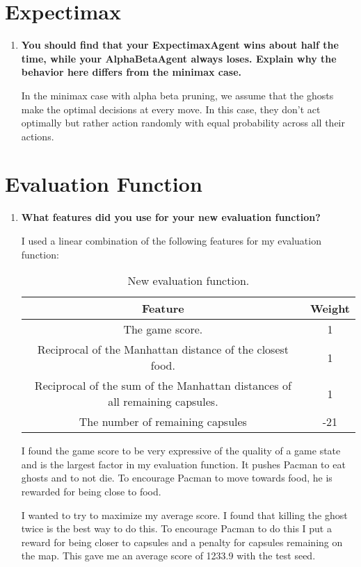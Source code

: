 \documentclass[fleqn]{hw}
\begin{document}
\section{Expectimax}
\begin{enumerate}
	\item \textbf{You should find that your ExpectimaxAgent wins about half the time, while your
AlphaBetaAgent always loses. Explain why the behavior here differs from the minimax case.}

In the minimax case with alpha beta pruning, we assume that the ghosts make the optimal decisions at every move. In this case, they don't act optimally but rather action randomly with equal probability across all their actions. 

\end{enumerate}

\section{Evaluation Function}
\begin{enumerate}
	\item \textbf{What features did you use for your new evaluation function?}

I used a linear combination of the following features for my evaluation function:

\begin{table}[H]
	\centering
	{\renewcommand{\arraystretch}{1.2}%
	\begin{tabular}{| c | c |}
	\hline
	\textbf{Feature} & \textbf{Weight}\\
	\hline
	The game score. & 1\\ \hline
	Reciprocal of the Manhattan distance of the closest food. & 1\\ \hline
	Reciprocal of the sum of the Manhattan distances of all remaining capsules. & 1\\ \hline
	The number of remaining capsules & -21\\ \hline
	\end{tabular}}
	\caption{New evaluation function.}
	\end{table}
	
I found the game score to be very expressive of the quality of a game state and is the largest factor in my evaluation function. It pushes Pacman to eat ghosts and to not die. To encourage Pacman to move towards food, he is rewarded for being close to food. 

I wanted to try to maximize my average score. I found that killing the ghost twice is the best way to do this. To encourage Pacman to do this I put a reward for being closer to capsules and a penalty for capsules remaining on the map. This gave me an average score of 1233.9 with the test seed.

\end{enumerate}
\end{document}
